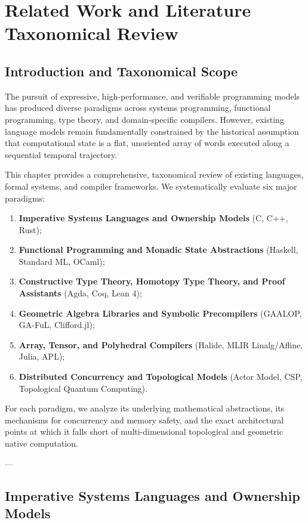 \chapter{Related Work and Literature Taxonomical Review}
\label{ch:related_work}

\section{Introduction and Taxonomical Scope}
\label{sec:tax_scope}

The pursuit of expressive, high-performance, and verifiable programming models has produced diverse paradigms across systems programming, functional programming, type theory, and domain-specific compilers. However, existing language models remain fundamentally constrained by the historical assumption that computational state is a flat, unoriented array of words executed along a sequential temporal trajectory.

This chapter provides a comprehensive, taxonomical review of existing languages, formal systems, and compiler frameworks. We systematically evaluate six major paradigms:
\begin{enumerate}[leftmargin=1.5cm]
    \item \textbf{Imperative Systems Languages and Ownership Models} (C, C++, Rust);
    \item \textbf{Functional Programming and Monadic State Abstractions} (Haskell, Standard ML, OCaml);
    \item \textbf{Constructive Type Theory, Homotopy Type Theory, and Proof Assistants} (Agda, Coq, Lean 4);
    \item \textbf{Geometric Algebra Libraries and Symbolic Precompilers} (GAALOP, GA-FuL, Clifford.jl);
    \item \textbf{Array, Tensor, and Polyhedral Compilers} (Halide, MLIR Linalg/Affine, Julia, APL);
    \item \textbf{Distributed Concurrency and Topological Models} (Actor Model, CSP, Topological Quantum Computing).
\end{enumerate}

For each paradigm, we analyze its underlying mathematical abstractions, its mechanisms for concurrency and memory safety, and the exact architectural points at which it falls short of multi-dimensional topological and geometric native computation.

---

\section{Imperative Systems Languages and Ownership Models}
\label{sec:imperative_rust}

